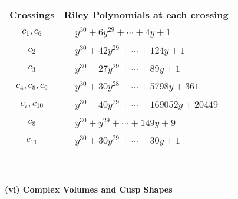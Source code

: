 \documentclass[1p]{elsarticle_modified}
\theoremstyle{definition}
\begin{document}
\begin{tabular}{m{50pt}|m{274pt}}
Crossings & \hspace{64pt}Riley Polynomials at each crossing \\
\hline $$\begin{aligned}c_{1},c_{6}\end{aligned}$$&$\begin{aligned}
&y^{30}+6 y^{29}+\cdots+4 y+1
\end{aligned}$\\
\hline $$\begin{aligned}c_{2}\end{aligned}$$&$\begin{aligned}
&y^{30}+42 y^{29}+\cdots+124 y+1
\end{aligned}$\\
\hline $$\begin{aligned}c_{3}\end{aligned}$$&$\begin{aligned}
&y^{30}-27 y^{29}+\cdots+89 y+1
\end{aligned}$\\
\hline $$\begin{aligned}c_{4},c_{5},c_{9}\end{aligned}$$&$\begin{aligned}
&y^{30}+30 y^{28}+\cdots+5798 y+361
\end{aligned}$\\
\hline $$\begin{aligned}c_{7},c_{10}\end{aligned}$$&$\begin{aligned}
&y^{30}-40 y^{29}+\cdots-169052 y+20449
\end{aligned}$\\
\hline $$\begin{aligned}c_{8}\end{aligned}$$&$\begin{aligned}
&y^{30}+y^{29}+\cdots+149 y+9
\end{aligned}$\\
\hline $$\begin{aligned}c_{11}\end{aligned}$$&$\begin{aligned}
&y^{30}+30 y^{29}+\cdots-30 y+1
\end{aligned}$\\
\hline
\end{tabular}\\~\\
\newpage\flushleft \textbf{(vi) Complex Volumes and Cusp Shapes}
\end{document}
